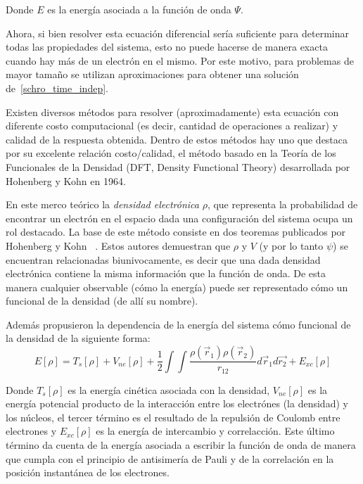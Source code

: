 Donde $E$ es la energ\'ia asociada a la funci\'on de onda $\Psi$.

Ahora, si bien resolver esta ecuaci\'on diferencial ser\'ia suficiente para determinar todas las propiedades del sistema, esto no puede hacerse de
manera exacta cuando hay m\'as de un electrón en el mismo. Por este motivo, para problemas de mayor tama\~no se utilizan aproximaciones 
para obtener una soluci\'on de~\ref{schro_time_indep}.

Existen diversos m\'etodos para resolver (aproximadamente) esta ecuaci\'on con diferente costo computacional (es decir, cantidad de operaciones a realizar)
y calidad de la respuesta obtenida. Dentro de estos métodos hay uno que destaca por su excelente relación costo/calidad, el método basado en la Teoría de los Funcionales de la Densidad 
(DFT, Density Functional Theory) desarrollada por Hohenberg y Kohn en 1964.

En este merco teórico la \textit{densidad electr\'onica} $\rho$, que representa la probabilidad de encontrar un electr\'on en
el espacio dada una configuraci\'on del sistema ocupa un rol destacado.
La base de este m\'etodo consiste en dos teoremas publicados por Hohenberg y Kohn ~\cite{HohenbergKohn}.
Estos autores demuestran que $\rho$ y $V$ (y por lo tanto $\psi$) se encuentran relacionadas biunivocamente, 
es decir que una dada densidad electrónica contiene la misma información que la función de onda.
De esta manera cualquier observable (cómo la energía) puede ser representado cómo un funcional de la densidad (de allí su nombre).

Además propusieron la dependencia de la energía del sistema cómo funcional de la densidad de la siguiente forma:
\begin{equation}
    \label{hohenberg_kohn_energy}
    E[\rho] = T_s[\rho] + V_{ne}[\rho] + \frac{1}{2} \int \int \frac{\rho(\vec{r}_1) \rho(\vec{r}_2)}{r_{12}} d\vec{r}_1 d\vec{r_2} + E_{xc}[\rho]
\end{equation}

Donde $T_s[\rho]$ es la energ\'ia cin\'etica asociada con la densidad, $V_{ne}[\rho]$ es la energ\'ia potencial producto de la interacci\'on entre los
electr\'ones (la densidad) y los n\'ucleos, el tercer t\'ermino es el resultado de la repulsi\'on de Coulomb entre electrones y $E_{xc}[\rho]$ es la
energ\'ia de intercambio y correlacci\'on. Este último término da cuenta de la energía asociada a escribir la función de onda de manera que cumpla con el principio de antisimería de Pauli y de la correlación
en la posición instantánea de los electrones.


